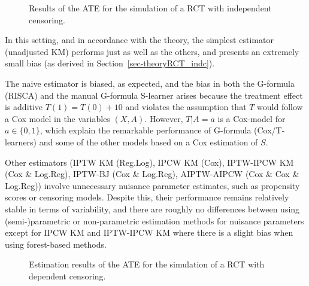 \documentclass[
  11pt,
  a4paper,
]{article}
\theoremstyle{plain}
\theoremstyle{plain}
\theoremstyle{plain}
\theoremstyle{definition}
\theoremstyle{remark}
\begin{document}
\begin{figure}


\caption{\label{fig-rct1}Results of the ATE for the simulation of a RCT
with independent censoring.}

\end{figure}%

In this setting, and in accordance with the theory, the simplest
estimator (unadjusted KM) performs just as well as the others, and
presents an extremely small bias (as derived in
Section~\ref{sec-theoryRCT_indc}).

The naive estimator is biased, as expected, and the bias in both the
G-formula (RISCA) and the manual G-formula S-learner arises because the
treatment effect is additive \(T(1) = T(0) + 10\) and violates the
assumption that \(T\) would follow a Cox model in the variables
\((X,A)\). However, \(T|A=a\) is a Cox-model for \(a \in \{0,1\}\),
which explain the remarkable performance of G-formula (Cox/T-learners)
and some of the other models based on a Cox estimation of \(S\).

Other estimators (IPTW KM (Reg.Log), IPCW KM (Cox), IPTW-IPCW KM (Cox \&
Log.Reg), IPTW-BJ (Cox \& Log.Reg), AIPTW-AIPCW (Cox \& Cox \& Log.Reg))
involve unnecessary nuisance parameter estimates, such as propensity
scores or censoring models. Despite this, their performance remains
relatively stable in terms of variability, and there are roughly no
differences between using (semi-)parametric or non-parametric estimation
methods for nuisance parameters except for IPCW KM and IPTW-IPCW KM
where there is a slight bias when using forest-based methods.

\begin{figure}


\caption{\label{fig-rct2}Estimation results of the ATE for the
simulation of a RCT with dependent censoring.}

\end{figure}%
\end{document}
